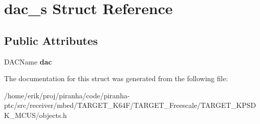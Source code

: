 \hypertarget{structdac__s}{}\section{dac\+\_\+s Struct Reference}
\label{structdac__s}
\subsection*{Public Attributes}
\begin{DoxyCompactItemize}
\item 
D\+A\+C\+Name {\bfseries dac}\hypertarget{structdac__s_ac8d8a807ff7a23cfe3c9ea62c7b587c6}{}\label{structdac__s_ac8d8a807ff7a23cfe3c9ea62c7b587c6}

\end{DoxyCompactItemize}


The documentation for this struct was generated from the following file\+:\begin{DoxyCompactItemize}
\item 
/home/erik/proj/piranha/code/piranha-\/ptc/src/receiver/mbed/\+T\+A\+R\+G\+E\+T\+\_\+\+K64\+F/\+T\+A\+R\+G\+E\+T\+\_\+\+Freescale/\+T\+A\+R\+G\+E\+T\+\_\+\+K\+P\+S\+D\+K\+\_\+\+M\+C\+U\+S/objects.\+h\end{DoxyCompactItemize}
